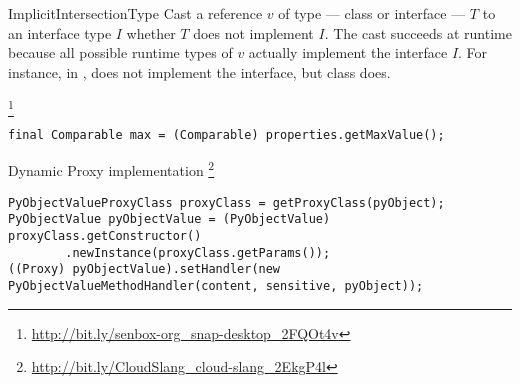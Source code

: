 \begin{pattern}{ImplicitIntersectionType}
Cast a reference $v$ of type --- class or interface --- $T$ to an
interface type $I$ whether $T$ does not implement $I$.
The cast succeeds at runtime because all possible runtime types of $v$
actually implement the interface $I$.
For instance, in ,  does not
implement the  interface, but class  does.

\instances{}

\footnote{\url{http://bit.ly/senbox-org_snap-desktop_2FQOt4v}}

\begin{verbatim}
final Comparable max = (Comparable) properties.getMaxValue();
\end{verbatim}

Dynamic Proxy implementation
\footnote{\url{http://bit.ly/CloudSlang_cloud-slang_2EkgP4l}}

\begin{verbatim}
PyObjectValueProxyClass proxyClass = getProxyClass(pyObject);
PyObjectValue pyObjectValue = (PyObjectValue) proxyClass.getConstructor()
        .newInstance(proxyClass.getParams());
((Proxy) pyObjectValue).setHandler(new PyObjectValueMethodHandler(content, sensitive, pyObject));
\end{verbatim}

\detection{}

\discussion{}

\related{}

\end{pattern}